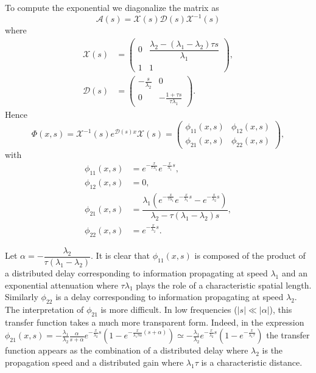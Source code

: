 \documentclass[preprint]{elsarticle}
\begin{document}
To compute the exponential we diagonalize the matrix as 
\begin{equation}
\mathscr{A}(s) = \mathscr{X}(s)\mathscr{D}(s)\mathscr{X}^{-1}(s)
\end{equation} 
where  
\begin{align}
\mathscr{X}(s) &= \begin{pmatrix}
0 & \dfrac{\lambda_2 - (\lambda_1 - \lambda_2) \tau s}{\lambda_1} \\
1 & 1
\end{pmatrix}, \\
\mathscr{D}(s) &= \begin{pmatrix}
-\frac{s}{\lambda_2} & 0 \\
 0 & -\frac{1+\tau s}{\tau \lambda_1}
\end{pmatrix}.
\end{align}
Hence
\begin{equation}
\Phi(x,s) =  \mathscr{X}^{-1}(s)e^{\mathscr{D}(s)x}\mathscr{X}(s) =
\begin{pmatrix}
\phi_{11}(x,s) & \phi_{12}(x,s) \\ 
\phi_{21}(x,s) & \phi_{22}(x,s)
\end{pmatrix},
\end{equation}
with
\begin{subequations} \label{TFv0q0tovxqx}
\begin{align}
\phi_{11}(x,s) &= e^{-\frac{x}{\tau \lambda_1}}e^{-\frac{x}{\lambda_1}s}, \\ 
\phi_{12}(x,s) &= 0, \\
\phi_{21}(x,s) &= \dfrac{\lambda_1 \left( e^{-\frac{x}{\tau \lambda_1}}e^{-\frac{x}{\lambda_1}s} - e^{-\frac{x}{\lambda_2}s}\right)}{\lambda_2 - \tau (\lambda_1 - \lambda_2)s}, \\
\phi_{22}(x,s) &= e^{-\frac{x}{\lambda_2}s}.
\end{align}
\end{subequations}


Let $\alpha = -\dfrac{\lambda_2}{\tau(\lambda_1 - \lambda_2)}$. It is clear that $\phi_{11}\left(x,s\right)$ is composed of the product of a distributed delay corresponding to information propagating at speed $\lambda_{1}$ and an exponential attenuation where $\tau\lambda_{1}$ plays the role of a characteristic spatial length. Similarly $\phi_{22}$ is a delay corresponding to information propagating at speed $\lambda_{2}$. The interpretation of $\phi_{21}$ is more difficult. In low frequencies ($\left|s\right|\ll\left|\alpha\right|$), this transfer function takes a much more transparent form. Indeed, in the expression
$
\phi_{21}(x,s) = 
-\frac{\lambda_{1}}{\lambda_{2}}\frac{\alpha}
{s + \alpha}
e^{-\frac{x}{\lambda_2}s}
	\left(
		1 - e^{-\frac{x}{\lambda_1 \tau \alpha}\left(s + \alpha\right)}
	\right)
\simeq 
- \frac{\lambda_{1}}{\lambda_{2}} e^{-\frac{x}{\lambda_2}s}
	\left(
		1 - e^{-\frac{x}{\lambda_1 \tau}}
	\right)
$
the transfer function appears as the combination of a distributed delay where $\lambda_{2}$ is the propagation speed and a distributed gain where $\lambda_{1}\tau$ is a characteristic distance.
\end{document}
